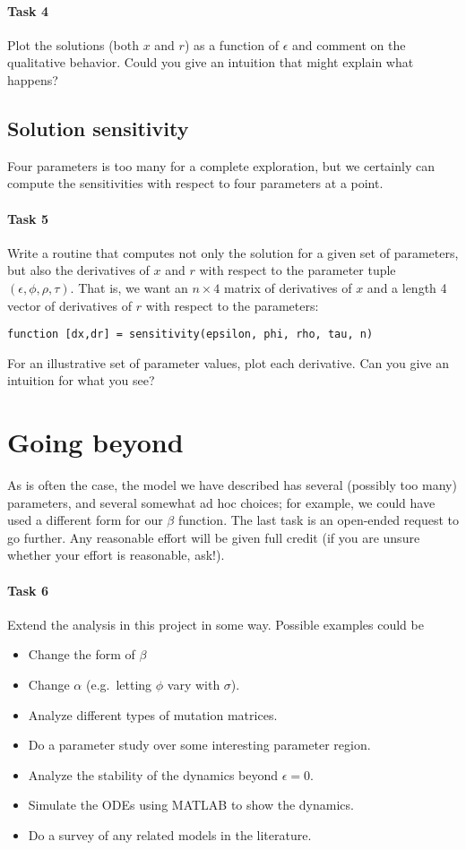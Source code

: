 \documentclass[12pt, leqno]{article} %
\begin{document}
\paragraph{Task 4}
Plot the solutions (both $x$ and $r$) as a function of $\epsilon$ and
comment on the qualitative behavior.  Could you give an intuition that
might explain what happens?

\subsection{Solution sensitivity}

Four parameters is too many for a complete exploration,
but we certainly can compute the sensitivities with respect
to four parameters at a point.

\paragraph{Task 5}
Write a routine that computes
not only the solution for a given set of parameters, but also
the derivatives of $x$ and $r$ with respect to the parameter
tuple $(\epsilon, \phi, \rho, \tau)$.  That is, we want an
$n \times 4$ matrix of derivatives of $x$ and a length 4
vector of derivatives of $r$ with respect to the parameters:
\begin{lstlisting}[frame=single]
function [dx,dr] = sensitivity(epsilon, phi, rho, tau, n)
\end{lstlisting}
For an illustrative set of parameter values, plot each derivative.
Can you give an intuition for what you see?

\section{Going beyond}

As is often the case, the model we have described has several
(possibly too many) parameters, and several somewhat ad hoc choices;
for example, we could have used a different form for our $\beta$
function.  The last task is an open-ended request to go further.  Any
reasonable effort will be given full credit (if you are unsure whether
your effort is reasonable, ask!).

\paragraph{Task 6}
Extend the analysis in this project in some way.  Possible examples
could be
\begin{itemize}
\item Change the form of $\beta$
\item Change $\alpha$ (e.g.~letting $\phi$ vary with $\sigma$).
\item Analyze different types of mutation matrices.
\item Do a parameter study over some interesting parameter region.
\item Analyze the stability of the dynamics beyond $\epsilon = 0$.
\item Simulate the ODEs using MATLAB to show the dynamics.
\item Do a survey of any related models in the literature.
\end{itemize}
\end{document}
